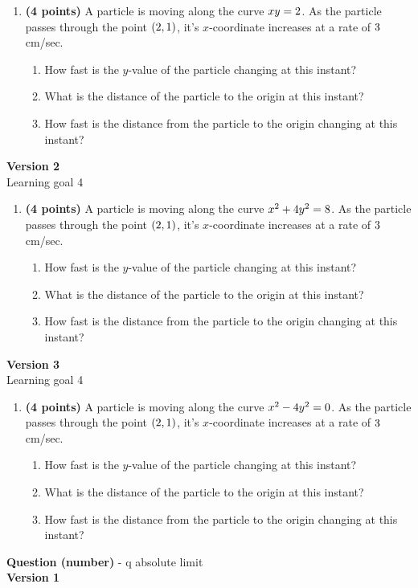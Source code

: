 \documentclass[12pt]{amsart}
\begin{document}
\begin{enumerate}[resume]
\item {\bf (4 points)} 
 A particle is moving along the curve $xy = 2$. As the particle passes through the point $(2,1)$, it's $x$-coordinate increases at a rate of $3$cm/sec. \begin{enumerate}
\item How fast is the $y$-value of the particle changing at this instant? \vfill \vfill
\item What is the distance of the particle to the origin at this instant? \vfill
\item How fast is the distance from the particle to the origin changing at this instant? \vfill \vfill
\end{enumerate}

 \end{enumerate}$ $ \\ {\bf Version 2} \\ 
Learning goal 4
\begin{enumerate}[resume]
\item {\bf (4 points)} 
 A particle is moving along the curve $x^2 + 4y^{2} = 8$. As the particle passes through the point $(2,1)$, it's $x$-coordinate increases at a rate of $3$cm/sec. \begin{enumerate}
\item How fast is the $y$-value of the particle changing at this instant? \vfill
\item What is the distance of the particle to the origin at this instant? \vfill
\item How fast is the distance from the particle to the origin changing at this instant? \vfill
\end{enumerate}

 \end{enumerate}$ $ \\ {\bf Version 3} \\ 
Learning goal 4
\begin{enumerate}[resume]
\item {\bf (4 points)} 
 A particle is moving along the curve $x^2 - 4y^{2} = 0$. As the particle passes through the point $(2,1)$, it's $x$-coordinate increases at a rate of $3$cm/sec. \begin{enumerate}
\item How fast is the $y$-value of the particle changing at this instant? \vfill
\item What is the distance of the particle to the origin at this instant? \vfill
\item How fast is the distance from the particle to the origin changing at this instant? \vfill
\end{enumerate}

 \end{enumerate}\newpage\newpage\def \a{5}\def \k{4}\def \abstop{1}\def \ktop{1}{\Large{\bf Question (number)}} - q absolute limit\\ $ $ \\ {\bf Version 1} \\ 
\end{document}
